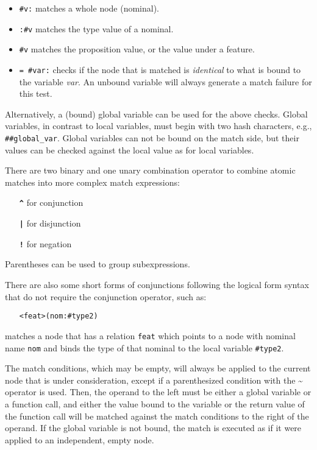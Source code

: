 \documentclass[11pt,a4paper]{report}
\newcommand{\cd}[1]{\texttt{#1}}
\begin{document}
\begin{itemize}
\item \cd{\#v:} matches a whole node (nominal).
\item \cd{:\#v} matches the type value of a nominal.
\item \cd{\#v} matches the proposition value, or the value under a feature.
\item \cd{= \#var:} checks if the node that is matched is \emph{identical} to
  what is bound to the variable \emph{var}. An unbound variable will always
  generate a match failure for this test.
\end{itemize}

Alternatively, a (bound) global variable can be used for the above checks.
Global variables, in contrast to local variables, must begin with two hash
characters, e.g., \texttt{\#\#global\_var}. Global variables can not be bound
on the match side, but their values can be checked against the local value as
for local variables.

There are two binary and one unary combination operator to combine atomic
matches into more complex match expressions:

\begin{itemize}\addtolength{\itemsep}{-.5\itemsep}
\item[\textbf{\cd{\^}}] for conjunction
\item[\textbf{\cd{|}}] for disjunction
\item[\textbf{\cd{!}}] for negation
\end{itemize}

Parentheses can be used to group subexpressions.

There are also some short forms of conjunctions following the logical form
syntax that do not require the conjunction operator, such as:

\begin{itemize}
\item[] \cd{<feat>(nom:\#type2)}
\end{itemize}
matches a node that has a relation \cd{feat} which points to a node with
nominal name \cd{nom} and binds the type of that nominal to the local variable
\cd{\#type2}.

The match conditions, which may be empty, will always be applied to the current
node that is under consideration, except if a parenthesized condition with the
\textbf{\~} operator is used. Then, the operand to the left must be either a
global variable or a function call, and either the value bound to the variable
or the return value of the function call will be matched against the match
conditions to the right of the operand. If the global variable is not bound,
the match is executed as if it were applied to an independent, empty node.
\end{document}
